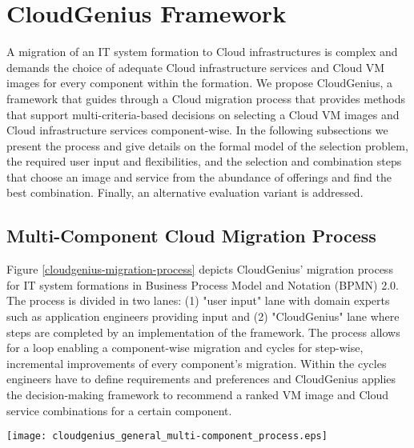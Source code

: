 \documentclass[10pt]{article}
\begin{document}
\section{CloudGenius Framework}\label{framework}

A migration of an IT system formation to Cloud infrastructures is complex and demands the choice of adequate Cloud infrastructure services and Cloud VM images for every component within the formation. We propose CloudGenius, a framework that guides through a Cloud migration process that provides methods that support multi-criteria-based decisions on selecting a Cloud VM images and Cloud infrastructure services component-wise. 
In the following subsections we present the process and give details on the formal model of the selection problem, the required user input and flexibilities, and the selection and combination steps that choose an image and service from the abundance of offerings and find the best combination. Finally, an alternative evaluation variant is addressed.









\subsection{Multi-Component Cloud Migration Process}





Figure \ref{cloudgenius-migration-process} depicts CloudGenius' migration process for IT system formations in Business Process Model and Notation (BPMN) 2.0. The process is divided in two lanes: (1)  "user input" lane with domain experts such as application engineers providing input and (2) "CloudGenius" lane where steps are completed by an implementation of the framework. 
The process allows for a loop enabling a component-wise migration and cycles for step-wise, incremental improvements of every component's migration. Within the cycles engineers have to define requirements and preferences and CloudGenius applies the  decision-making framework to recommend a ranked VM image and Cloud service combinations for a certain component. 

\begin{sidewaysfigure}[!p]
\centering
\texttt{[image: cloudgenius\_general\_multi-component\_process.eps]} 
\caption{Multi-Component Migration Process of the CloudGenius Framework}\label{cloudgenius-migration-process}
\end{sidewaysfigure}
\end{document}
